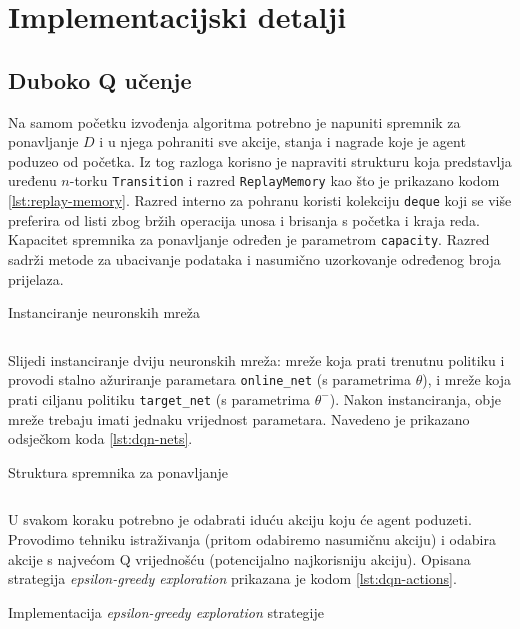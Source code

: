 \section{Implementacijski detalji}

\subsection{Duboko Q učenje}

Na samom početku izvođenja algoritma potrebno je napuniti spremnik za ponavljanje $D$ i u njega pohraniti sve akcije, stanja i nagrade koje je agent poduzeo od početka. Iz tog razloga korisno je napraviti strukturu koja predstavlja uređenu $n$-torku \texttt{Transition} i razred \texttt{ReplayMemory} kao što je prikazano kodom \ref{lst:replay-memory}. Razred interno za pohranu koristi kolekciju \texttt{deque}  koji se više preferira od listi zbog bržih operacija unosa i brisanja s početka i kraja reda. Kapacitet spremnika za ponavljanje određen je parametrom \texttt{capacity}. Razred sadrži metode za ubacivanje podataka i nasumično uzorkovanje određenog broja prijelaza.

\begin{listing}[H]
    \caption{Instanciranje neuronskih mreža}
    \inputminted{python}{snippets/replay-memory.py}
    \label{lst:replay-memory}
\end{listing}

Slijedi instanciranje dviju neuronskih mreža: mreže koja prati trenutnu politiku i provodi stalno ažuriranje parametara \texttt{online_net} (s parametrima $\theta$), i mreže koja prati ciljanu politiku \texttt{target_net} (s parametrima $\theta^-$). Nakon instanciranja, obje mreže trebaju imati jednaku vrijednost parametara. Navedeno je prikazano odsječkom koda \ref{lst:dqn-nets}.

\begin{listing}[H]
    \caption{Struktura spremnika za ponavljanje}
    \inputminted{python}{snippets/dqn-nets.py}
    \label{lst:dqn-nets}
\end{listing}

U svakom koraku potrebno je odabrati iduću akciju koju će agent poduzeti. Provodimo tehniku istraživanja (pritom odabiremo nasumičnu akciju) i odabira akcije s najvećom Q vrijednošću (potencijalno najkorisniju akciju). Opisana strategija \textit{epsilon-greedy exploration} prikazana je kodom \ref{lst:dqn-actions}.

\begin{listing}[H]
    \caption{Implementacija \textit{epsilon-greedy exploration} strategije}
    \inputminted{python}{snippets/dqn-actions.py}
    \label{lst:dqn-actions}
\end{listing}

